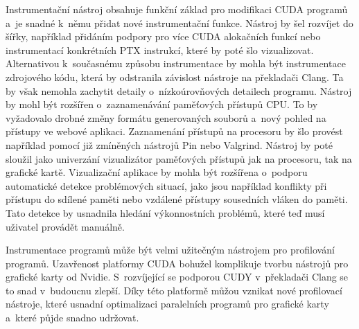 Instrumentační nástroj obsahuje funkční základ pro modifikaci CUDA programů a~je snadné k~němu přidat nové instrumentační funkce.
Nástroj by šel rozvíjet do šířky, například přidáním podpory pro více CUDA alokačních funkcí nebo instrumentací konkrétních PTX instrukcí, které by poté šlo vizualizovat. Alternativou k~současnému způsobu instrumentace by mohla být instrumentace zdrojového kódu, která by odstranila závislost nástroje na překladači Clang. Ta by však nemohla zachytit detaily o~nízkoúrovňových detailech programu.
Nástroj by mohl být rozšířen o~zaznamenávání paměťových přístupů CPU. To by vyžadovalo drobné změny formátu generovaných souborů a~nový pohled na přístupy ve webové aplikaci. Zaznamenání přístupů na procesoru by šlo provést například pomocí již zmíněných nástrojů Pin\cite{pin} nebo Valgrind\cite{valgrind}. Nástroj by poté sloužil jako univerzání vizualizátor paměťových přístupů jak na procesoru, tak na grafické kartě. Vizualizační aplikace by mohla být rozšířena o~podporu automatické detekce problémových situací, jako jsou například konflikty při přístupu do sdílené paměti nebo vzdálené přístupy sousedních vláken do paměti. Tato detekce by usnadnila hledání výkonnostních problémů, které teď musí uživatel provádět manuálně.

Instrumentace programů může být velmi užitečným nástrojem pro profilování programů. Uzavřenost platformy CUDA bohužel komplikuje tvorbu nástrojů pro grafické karty od Nvidie. S~rozvíjející se podporou CUDY v~překladači Clang se to snad v~budoucnu zlepší. Díky této platformě můžou vznikat nové profilovací nástroje, které usnadní optimalizaci paralelních programů pro grafické karty a~které půjde snadno udržovat.
